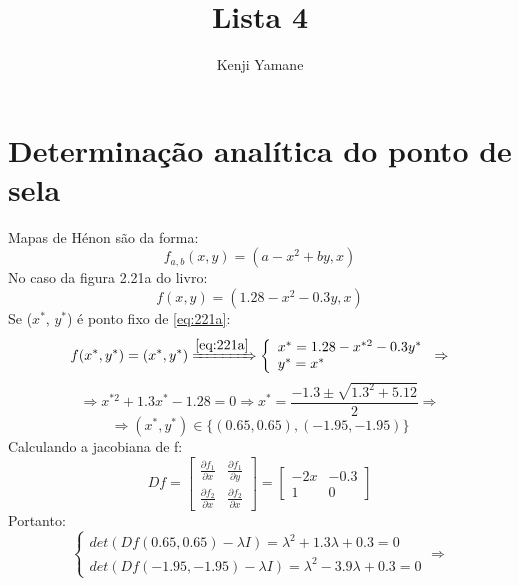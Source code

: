 \documentclass{article}[twocolumn]
\title{Lista 4}
\author{Kenji Yamane}
\begin{document}
	\maketitle
	\newpage
	\section{Determina\c{c}\~ao anal\'itica do ponto de sela}
	Mapas de H\'enon s\~ao da forma:
	\begin{equation}
		f_{a, b}(x, y) = (a - x^{2} + by, x)
		\nonumber
	\end{equation}
	No caso da figura 2.21a do livro:
	\begin{equation}
		\label{eq:221a}
		f(x, y) = (1.28 - x^{2} - 0.3y, x)
	\end{equation}
	Se ($x^{*}$, $y^{*}$) \'e ponto fixo de \ref{eq:221a}:
	\begin{equation}
		f(x^{*}, y^{*}) = (x^{*}, y^{*}) \xRightarrow{\ref{eq:221a}}
		\left\{\begin{array}{l}
			x^{*} = 1.28 - x^{*2} - 0.3y^{*}\\
			y^{*} = x^{*}
		\end{array}\right. \Rightarrow
		\nonumber
	\end{equation}
	\begin{equation}
		\Rightarrow x^{*2} + 1.3x^{*} - 1.28 = 0
		\Rightarrow x^{*} = \frac{-1.3 \pm \sqrt{1.3^{2} + 5.12}}{2} \Rightarrow
		\nonumber
	\end{equation}
	\begin{equation}
		\Rightarrow (x^{*}, y^{*}) \in \{(0.65, 0.65), (-1.95, -1.95)\}
		\nonumber
	\end{equation}
	Calculando a jacobiana de f:
	\begin{equation}
		Df = \left[\begin{array}{cc}
			\frac{\partial f_{1}}{\partial x} & \frac{\partial f_{1}}{\partial y}\\
			\frac{\partial f_{2}}{\partial x} & \frac{\partial f_{2}}{\partial x}
		\end{array}\right]
		= \left[\begin{array}{cc}
			-2x & -0.3\\
			1 & 0
		\end{array}\right]
		\nonumber
	\end{equation}
	Portanto:
	\begin{equation}
		\left\{\begin{array}{l}
			det(Df(0.65, 0.65) - \lambda I) = \lambda^{2} + 1.3\lambda + 0.3 = 0\\
			det(Df(-1.95, -1.95) - \lambda I) = \lambda^{2} - 3.9\lambda + 0.3 = 0
		\end{array}\right. \Rightarrow
		\nonumber
	\end{equation}
\end{document}
